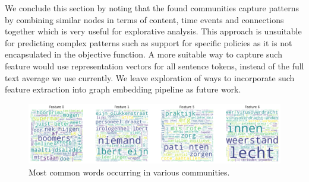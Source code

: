 We conclude this section by noting that the found communities capture patterns by combining similar nodes in terms of content, time events and connections together which is very useful for explorative analysis. 
This approach is unsuitable for predicting complex patterns such as support for specific policies as it is not encapsulated in the objective function.
A more suitable way to capture such feature would use representation vectors for all sentence tokens, instead of  the full text average we use currently.
We leave exploration of ways to incorporate such feature extraction into graph embedding pipeline as future work. 

\begin{figure}[!ht]
\centering
\includegraphics[width=\columnwidth]{resources/figs/case_study/12_cluster_cloud.pdf}
\caption{
    Most common words occurring in various communities.
}
\label{fig:cs_cluster_cloud}
\end{figure}